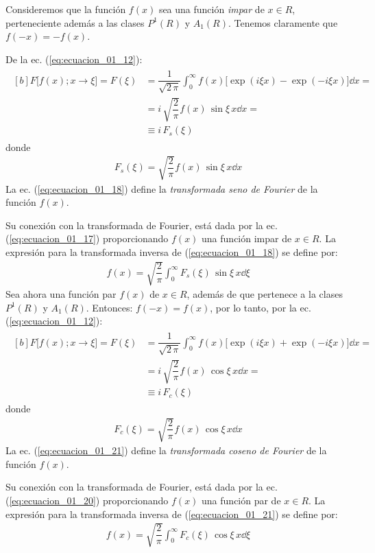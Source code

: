 Consideremos que la función $f(x)$ sea una función \emph{impar} de $x \in R$, perteneciente además a las clases $P^{1} (R)$ y $A_{1} (R)$. Tenemos claramente que $f(-x) = - f(x)$. 
\par
De la ec. (\ref{eq:ecuacion_01_12}):
\begin{align}
\begin{aligned}[b]
F \big[ f(x); x \to \xi \big] = F(\xi) &= \dfrac{1}{\sqrt{2 \, \pi}} \int_{0}^{\infty} f(x) \big[\exp(i \xi x) {-} \exp(-i \xi x) \big] \dd{x} = \\[0.5em]
&= i \, \sqrt{\dfrac{2}{\pi}} f(x) \, \sin \xi \, x \dd{x} = \\[0.5em]
&\equiv i \, F_{s} (\xi)
\end{aligned}
\label{eq:ecuacion_01_17}
\end{align}
donde
\begin{align}
F_{s} (\xi) = \sqrt{\dfrac{2}{\pi}} f(x) \, \sin \xi \, x \dd{x}
\label{eq:ecuacion_01_18}
\end{align}
La ec. (\ref{eq:ecuacion_01_18}) define la \emph{transformada seno de Fourier} de la función $f(x)$.
\par
Su conexión con la transformada de Fourier, está dada por la ec. (\ref{eq:ecuacion_01_17}) proporcionando $f (x)$ una función impar de $x \in R$. La expresión para la transformada inversa de (\ref{eq:ecuacion_01_18}) se define por:
\begin{align}
f(x) = \sqrt{\dfrac{2}{\pi}} \int_{0}^{\infty} F_{s}(\xi) \, \sin \xi \, x \dd{\xi}
\label{eq:ecuacion_01_19}
\end{align}
Sea ahora una función par $f(x)$ de $x \in R$, además de que pertenece a la clases $P^{1}(R)$ y $A_{1}(R)$. Entonces: $f(-x) = f(x)$, por lo tanto, por la ec. (\ref{eq:ecuacion_01_12}):
\begin{align}
\begin{aligned}[b]
F \big[ f(x); x \to \xi \big] = F(\xi) &= \dfrac{1}{\sqrt{2 \, \pi}} \int_{0}^{\infty} f(x) \big[\exp(i \xi x) {+} \exp(-i \xi x) \big] \dd{x} = \\[0.5em]
&= i \, \sqrt{\dfrac{2}{\pi}} f(x) \, \cos \xi \, x \dd{x} = \\[0.5em]
&\equiv i \, F_{c} (\xi)    
\end{aligned}
\label{eq:ecuacion_01_20}
\end{align}
donde
\begin{align}
F_{c} (\xi) = \sqrt{\dfrac{2}{\pi}} f(x) \, \cos \xi \, x \dd{x}
\label{eq:ecuacion_01_21}
\end{align}
La ec. (\ref{eq:ecuacion_01_21}) define la \emph{transformada coseno de Fourier} de la función $f(x)$.
\par
Su conexión con la transformada de Fourier, está dada por la ec. (\ref{eq:ecuacion_01_20}) proporcionando $f (x)$ una función par de $x \in R$. La expresión para la transformada inversa de (\ref{eq:ecuacion_01_21}) se define por:
\begin{align}
f(x) = \sqrt{\dfrac{2}{\pi}} \int_{0}^{\infty} F_{c}(\xi) \, \cos \xi \, x \dd{\xi}
\label{eq:ecuacion_01_22}
\end{align}

